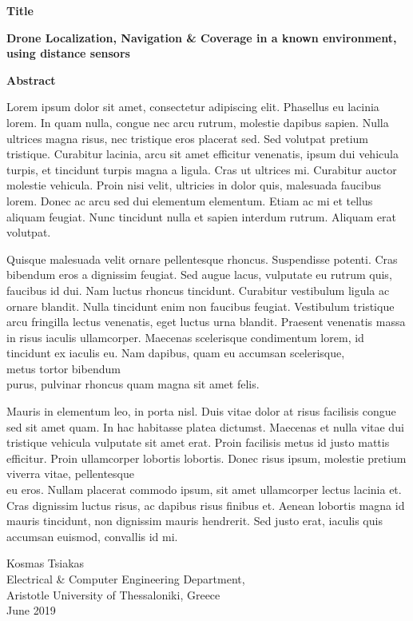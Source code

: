 {\selectfont

{}


\begin{center}
  \centering
  \textbf{\Large{Title}}
  \vspace{0.5cm}

  \textbf{\large{Drone Localization, Navigation \& Coverage in a known environment, using distance sensors}}

  \vspace{1cm}

  \centering
  \textbf{Abstract}
\end{center}

Lorem ipsum dolor sit amet, consectetur adipiscing elit. Phasellus eu lacinia lorem. In quam nulla, congue nec arcu rutrum, molestie dapibus sapien. Nulla ultrices magna risus, nec tristique eros placerat sed. Sed volutpat pretium tristique. Curabitur lacinia, arcu sit amet efficitur venenatis, ipsum dui vehicula turpis, et tincidunt turpis magna a ligula. Cras ut ultrices mi. Curabitur auctor molestie vehicula. Proin nisi velit, ultricies in dolor quis, malesuada faucibus lorem. Donec ac arcu sed dui elementum elementum. Etiam ac mi et tellus aliquam feugiat. Nunc tincidunt nulla et sapien interdum rutrum. Aliquam erat volutpat.

Quisque malesuada velit ornare pellentesque rhoncus. Suspendisse potenti. Cras bibendum eros a dignissim feugiat. Sed augue lacus, vulputate eu rutrum quis, faucibus id dui. Nam luctus rhoncus tincidunt. Curabitur vestibulum ligula ac ornare blandit. Nulla tincidunt enim non faucibus feugiat. Vestibulum tristique arcu fringilla lectus venenatis, eget luctus urna blandit. Praesent venenatis massa in risus iaculis ullamcorper. Maecenas scelerisque condimentum lorem, id tincidunt ex iaculis eu. Nam dapibus, quam eu accumsan scelerisque,\\ metus tortor bibendum \\purus, pulvinar rhoncus quam magna sit amet felis.

Mauris in elementum leo, in porta nisl. Duis vitae dolor at risus facilisis congue sed sit amet quam. In hac habitasse platea dictumst. Maecenas et nulla vitae dui tristique vehicula vulputate sit amet erat. Proin facilisis metus id justo mattis efficitur. Proin ullamcorper lobortis lobortis. Donec risus ipsum, molestie pretium viverra vitae, pellentesque\\ eu eros. Nullam placerat commodo ipsum, sit amet ullamcorper lectus lacinia et. Cras dignissim luctus risus, ac dapibus risus finibus et. Aenean lobortis magna id mauris tincidunt, non dignissim mauris hendrerit. Sed justo erat, iaculis quis accumsan euismod, convallis id mi.

\begin{flushright}
  \vspace{2cm}
  Kosmas Tsiakas
  \\
  Electrical \& Computer Engineering Department,
  \\
  Aristotle University of Thessaloniki, Greece
  \\
  June 2019
\end{flushright}

}
